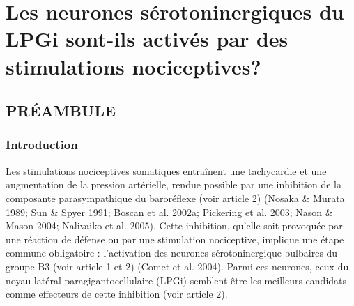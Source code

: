 \documentclass[a4paper,12pt,twoside]{report}
\begin{document}
\begin{figure}[p]
\label{Figure 11}

\end{figure}

\begin{table}

 \label{Tableau 2}
\end{table}

\cleardoublepage

\fancyhf{} %
\fancyfoot[C]{\bfseries -\thepage-}
\fancyhead[RO]{\bfseries\rightmark}
\renewcommand{\headrulewidth}{1pt}
\renewcommand{\footrulewidth}{1pt}
\addtolength{\headheight}{1pt} %

\chapter{Les neurones sérotoninergiques du LPGi sont-ils activés par des stimulations nociceptives?}

\section{PRÉAMBULE}

\subsection{Introduction}

Les stimulations nociceptives somatiques entraînent une tachycardie et une augmentation de la pression artérielle, rendue possible par une inhibition de la composante parasympathique du baroréflexe (voir article 2) (Nosaka \& Murata 1989; Sun \& Spyer 1991; Boscan et al. 2002a; Pickering et al. 2003; Nason \& Mason 2004; Nalivaiko et al. 2005). Cette inhibition, qu’elle soit provoquée par une réaction de défense ou par une stimulation nociceptive, implique une étape commune obligatoire : l’activation des neurones sérotoninergique bulbaires du groupe B3 (voir article 1 et 2) (Comet et al. 2004). Parmi ces neurones, ceux du noyau latéral paragigantocellulaire (LPGi) semblent être les meilleurs candidats comme effecteurs de cette inhibition (voir article 2).
\end{document}
